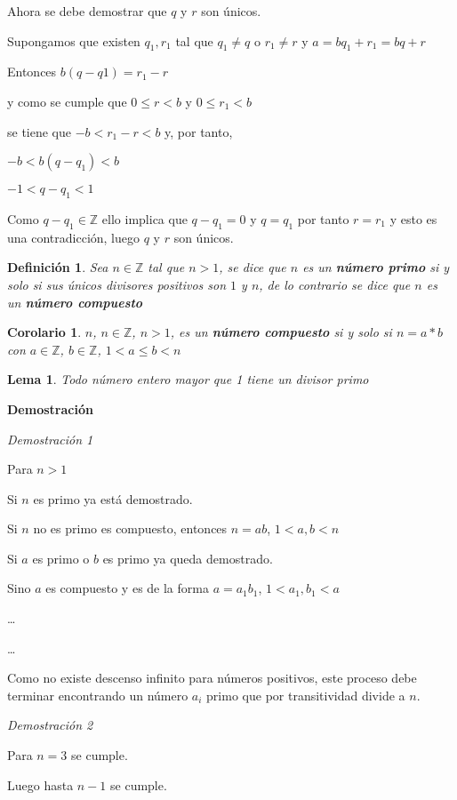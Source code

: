 \documentclass[a4paper,1pt]{report}
\newtheorem*{cor}{Corolario}
\newtheorem*{dfn}{Definición}
\newtheorem*{lem}{Lema}
\begin{document}
Ahora se debe demostrar que $q$ y $r$ son únicos.

Supongamos que existen $q_1,r_1$ tal que $q_1\neq q$ o $r_1\neq r$ y $a=bq_1+r_1=bq+r$

Entonces $b(q-q1)=r_1-r$

y como se cumple que $0\leq r < b$ y $0\leq r_1 < b$

se tiene que $-b<r_1-r<b$ y, por tanto,

$-b<b(q-q_1)<b$

$-1<q-q_1<1$

Como $q-q_1\in\mathbb{Z}$ ello implica que $q-q_1=0$ y $q=q_1$ por tanto $r = r_1$ y esto es una contradicción, luego $q$ y $r$ son únicos.



\begin{dfn}
 Sea $n\in\mathbb{Z}$ tal que $n>1$, se dice que $n$ es un \textbf{número primo} si y solo si sus únicos divisores positivos son $1$ y $n$, de lo contrario se dice que $n$ es un \textbf{número compuesto}
\end{dfn}

\begin{cor}
 $n$, $n\in\mathbb{Z}$, $n>1$, es un \textbf{número compuesto} si y solo si $n=a*b$ con $a\in\mathbb{Z}$, $b\in\mathbb{Z}$, $1<a\leq b < n$
\end{cor}

\begin{lem}
 Todo número entero mayor que 1 tiene un divisor primo
\end{lem}

\textbf{Demostración}

\textit{Demostración 1}

Para $n>1$

Si $n$ es primo ya está demostrado.

Si $n$ no es primo es compuesto, entonces $n=ab$, $1<a,b<n$

Si $a$ es primo o $b$ es primo ya queda demostrado.

Sino $a$ es compuesto y es de la forma $a=a_1b_1$, $1<a_1,b_1<a$

\dots

\dots

Como no existe descenso infinito para números positivos, este proceso debe terminar encontrando un número $a_i$ primo que por transitividad divide a $n$.

\textit{Demostración 2}

Para $n=3$ se cumple.

Luego hasta $n-1$ se cumple. 
\end{document}
